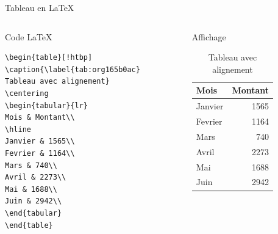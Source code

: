 \documentclass[presentation,t]{beamer}
\begin{document}
\begin{frame}[fragile,label={sec:org37c0312}]{Tableau en \LaTeX{}}
 \begin{columns}
\begin{column}{0.48\columnwidth}
Code \LaTeX{}

\lstset{language=[LaTeX]TeX,label= ,caption= ,captionpos=b,numbers=none}
\begin{lstlisting}
\begin{table}[!htbp]
\caption{\label{tab:org165b0ac}
Tableau avec alignement}
\centering
\begin{tabular}{lr}
Mois & Montant\\
\hline
Janvier & 1565\\
Fevrier & 1164\\
Mars & 740\\
Avril & 2273\\
Mai & 1688\\
Juin & 2942\\
\end{tabular}
\end{table}
\end{lstlisting}

\pause{}
\end{column}

\begin{column}{0.48\columnwidth}
Affichage

\begin{mdframed}
\begin{table}[!htbp]
\caption{\label{achats-par-mois}Tableau avec alignement}
\centering
\begin{tabular}{lr}
Mois & Montant\\
\hline
Janvier & 1565\\
Fevrier & 1164\\
Mars & 740\\
Avril & 2273\\
Mai & 1688\\
Juin & 2942\\
\end{tabular}
\end{table}

\end{mdframed}
\end{column}
\end{columns}
\end{frame}
\end{document}
